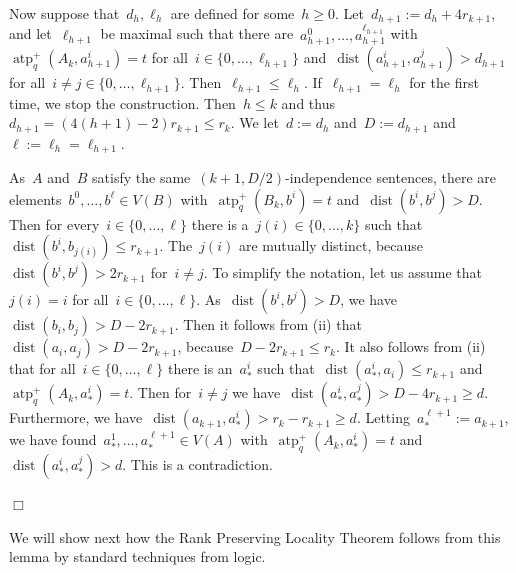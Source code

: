 \documentclass[11pt]{article}
\numberwithin{equation}{section}
\newcommand{\atp}{\operatorname{atp}^+}
\newcommand{\dist}{\operatorname{dist}}
\newcommand{\case}[1]{\par\medskip\noindent\textit{Case #1: }}
\newenvironment{cs}{
  \begin{description}
    \renewcommand{\case}[1]{\item[\itshape\mdseries Case ##1:]}
  }{
  \end{description}
}
\def\qed{\hspace*{\fill}$\Box$}
\newenvironment{proof}[1][]%
{\ifthenelse{\equal{#1}{}}{\noindent\textit{Proof.
    }}{\noindent\textit{#1. }}}%
{\qed\par\smallskip}
\begin{document}
\begin{proof}
\begin{cs}
    Now suppose that~$d_h,\ell_h$ are defined for some~$h\ge
    0$. Let~$d_{h+1}:=d_h+4r_{k+1}$, and let~$\ell_{h+1}$ be maximal
    such that there are~$a^0_{h+1},\ldots,a^{\ell_{h+1}}_{h+1}$
    with~$\atp_q(A_k,a_{h+1}^i)=t$ for all~$i\in\{0,\ldots,
    \ell_{h+1}\}$ and~$\dist(a_{h+1}^i,a_{h+1}^j)>d_{h+1}$ for
    all~$i\neq j\in\{0,\ldots,
    \ell_{h+1}\}$. Then~$\ell_{h+1}\le\ell_h$. If~$\ell_{h+1}=\ell_h$
    for the first time, we stop the construction. Then~$h\le k$ and
    thus~$d_{h+1}=(4(h+1)-2)r_{k+1}\le r_k$.  We let~$d:=d_h$
    and~$D:=d_{h+1}$ and~$\ell:=\ell_h=\ell_{h+1}$.
    
    As~$A$ and~$B$ satisfy the same~$(k+1,D/2)$-independence
    sentences, there are elements~$b^0,\ldots,b^\ell\in V(B)$
    with~$\atp_q(B_k,b^i)=t$ and~$\dist(b^i,b^j)>D$.  Then for
    every~$i\in\{0,\ldots, \ell\}$ there is a~$j(i)\in\{0,\ldots,k\}$
    such that~$\dist(b^i,b_{j(i)})\le r_{k+1}$. The~$j(i)$ are
    mutually distinct, because~$\dist(b^i,b^j)>2r_{k+1}$ for~$i\neq
    j$.  To simplify the notation, let us assume that~$j(i)=i$ for
    all~$i\in\{0,\ldots, \ell\}$. As~$\dist(b^i,b^j)>D$, we
    have~$\dist(b_i,b_j)>D-2r_{k+1}$. Then it follows from (ii)
    that~$\dist(a_i,a_j)>D-2r_{k+1}$, because~$D-2r_{k+1}\le r_k$. It
    also follows from (ii) that for all~$i\in\{0,\ldots, \ell\}$ there
    is an~$a^i_*$ such that~$\dist(a^i_*,a_i)\le r_{k+1}$
    and~$\atp_q(A_k,a^i_*)=t$. Then for~$i\neq j$ we
    have~$\dist(a^i_*,a^j_*)>D-4r_{k+1}\ge d$. Furthermore, we
    have~$\dist(a_{k+1},a^i_*)>r_k-r_{k+1}\ge
    d$. Letting~$a_*^{\ell+1}:=a_{k+1}$, we have
    found~$a_*^1,\ldots,a_*^{\ell+1}\in V(A)$
    with~$\atp_q(A_k,a_*^i)=t$ and~$\dist(a_*^i,a_*^j)>d$. This is a
    contradiction.
\end{cs}
\end{proof}

We will show next how the Rank Preserving Locality Theorem follows from this lemma by
standard techniques from logic.
\medskip
\end{document}
